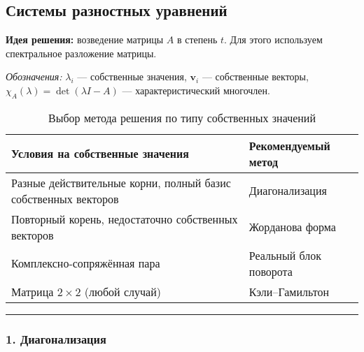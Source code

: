 \subsection{Системы разностных уравнений}\label{subsec:systems}



\textbf{Идея решения:} возведение матрицы $A$ в степень $t$. Для этого используем спектральное разложение матрицы.

\textit{Обозначения:} $\lambda_i$ — собственные значения, $\mathbf{v}_i$ — собственные векторы, $\chi_A(\lambda) = \det(\lambda I - A)$ — характеристический многочлен.

\begin{table}[h!]
\centering
\caption{Выбор метода решения по типу собственных значений}
\label{tab:method-selection}
\begin{tabular}{|l|l|}
\hline
\textbf{Условия на собственные значения} & \textbf{Рекомендуемый метод} \\
\hline
Разные действительные корни, полный базис собственных векторов & Диагонализация \\
\hline
Повторный корень, недостаточно собственных векторов & Жорданова форма \\
\hline
Комплексно-сопряжённая пара & Реальный блок поворота \\
\hline
Матрица $2 \times 2$ (любой случай) & Кэли–Гамильтон \\
\hline
\end{tabular}
\end{table}

\bigskip
\hrule
\bigskip

\subsubsection*{1. Диагонализация}

